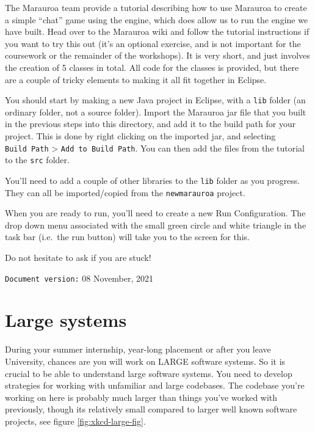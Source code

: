 \documentclass[
]{book}
\begin{document}
The Marauroa team provide a tutorial describing how to use Marauroa to create a simple ``chat'' game using the engine, which does allow us to run the engine we have built. Head over to the Marauroa wiki and follow the tutorial instructions if you want to try this out (it's an optional exercise, and is not important for the coursework or the remainder of the workshops). It is very short, and just involves the creation of 5 classes in total. All code for the classes is provided, but there are a couple of tricky elements to making it all fit together in Eclipse.

You should start by making a new Java project in Eclipse, with a \texttt{lib} folder (an ordinary folder, not a source folder). Import the Marauroa jar file that you built in the previous steps into this directory, and add it to the build path for your project. This is done by right clicking on the imported jar, and selecting \texttt{Build\ Path} \textgreater{} \texttt{Add\ to\ Build\ Path}. You can then add the files from the tutorial to the \texttt{src} folder.

You'll need to add a couple of other libraries to the \texttt{lib} folder as you progress. They can all be imported/copied from the \texttt{newmarauroa} project.

When you are ready to run, you'll need to create a new Run Configuration. The drop down menu associated with the small green circle and white triangle in the task bar (i.e.~the run button) will take you to the screen for this.

Do not hesitate to ask if you are stuck!

\texttt{Document\ version:} 08 November, 2021

\hypertarget{understanding}{%
\chapter{Large systems}\label{understanding}}

During your summer internship, year-long placement or after you leave University, chances are you will work on LARGE software systems. So it is crucial to be able to understand large software systems. You need to develop strategies for working with unfamiliar and large codebases. The codebase you're working on here is probably much larger than things you've worked with previously, though its relatively small compared to larger well known software projects, see figure \ref{fig:xkcd-large-fig}.
\end{document}
